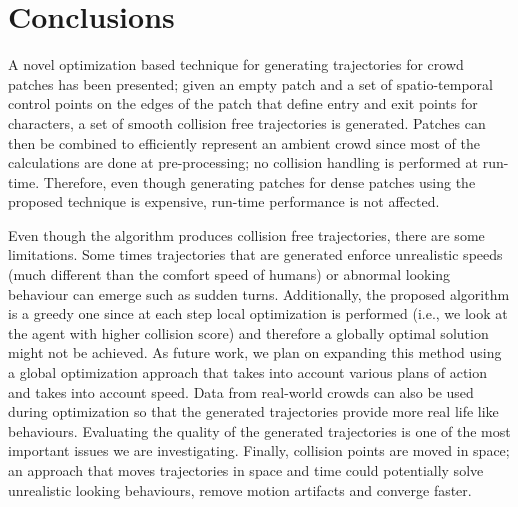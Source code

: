 \section{Conclusions}
\label{sec:conclusions}

A novel optimization based technique for generating trajectories for crowd patches has been presented;
given an empty patch and a set of spatio-temporal control points on the edges of the patch that define entry and exit points for characters, a set of smooth collision free trajectories is generated.
Patches can then be combined to efficiently represent an ambient crowd since most of the calculations are done at pre-processing; no collision handling is performed at run-time.
Therefore, even though generating patches for dense patches using the proposed technique is expensive, run-time performance is not affected.

Even though the algorithm produces collision free trajectories, there are some limitations.
Some times trajectories that are generated enforce unrealistic speeds (much different than the comfort speed of humans) or abnormal looking behaviour can emerge such  as sudden turns.
Additionally, the proposed algorithm is a greedy one since at each step local optimization is performed (i.e., we look at the agent with higher collision score) and therefore a globally optimal solution might not be achieved.
As future work, we plan on expanding this method using a global optimization approach that takes into account various plans of action and takes into account speed.
Data from real-world crowds can also be used during optimization so that the generated trajectories provide more real life like behaviours.
Evaluating the quality of the generated trajectories is one of the most important issues we are investigating.
Finally, collision points are moved in space; an approach that moves trajectories in space and time could potentially solve unrealistic looking behaviours, remove motion artifacts and converge faster.

